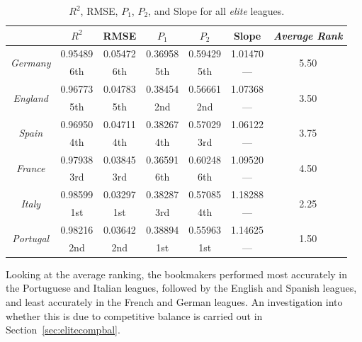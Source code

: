 \documentclass[a4paper,10pt]{report}
\begin{document}
\begin{table}[h!]\begin{center}\begin{tabular}{c||c|c|c|c|c||c}
&$R^2$ 		&RMSE		&$P_1$ 		&$P_2$ & Slope &\textit{Average Rank}\\ \hline \hline
\multirow{2}{*}{\textit{Germany}}	&0.95489	&0.05472	&0.36958	&0.59429& 1.01470 &
\multirow{2}{*}{5.50}\\ 
& 6th		& 6th		& 5th		& 5th 	& ---& \\\hline
\multirow{2}{*}{\textit{England}}	&0.96773	&0.04783	&0.38454	&0.56661 & 1.07368& \multirow{2}{*}{3.50}\\
& 5th		& 5th		& 2nd		& 2nd 	& --- & \\\hline
\multirow{2}{*}{\textit{Spain}}	&0.96950	&0.04711	&0.38267	&0.57029&  1.06122 &
\multirow{2}{*}{3.75}\\ 
& 4th		& 4th		& 4th		& 3rd 	&--- & \\\hline
\multirow{2}{*}{\textit{France}}	&0.97938	&0.03845	&0.36591	&0.60248& 1.09520 &
\multirow{2}{*}{4.50}\\ 
& 3rd		& 3rd		& 6th		& 6th 	&--- & \\\hline
\multirow{2}{*}{\textit{Italy}}	&0.98599	&0.03297	&0.38287	&0.57085& 1.18288 & 
\multirow{2}{*}{2.25}\\
& 1st		& 1st		& 3rd		& 4th 	&--- & \\\hline
\multirow{2}{*}{\textit{Portugal}}&0.98216	&0.03642	&0.38894	&0.55963&1.14625 &
\multirow{2}{*}{1.50}\\
& 2nd		& 2nd		& 1st		& 1st	& ---
\end{tabular}\end{center}\caption{$R^2$, RMSE, $P_1$, $P_2$, and Slope for all \textit{elite} leagues.}\label{tab:leaguevalues}
\end{table}


Looking at the average ranking, the bookmakers performed most accurately in the Portuguese and Italian leagues, followed by the English and Spanish leagues, and least accurately in the French and German leagues. An investigation into whether this is due to competitive balance is carried out in Section~\ref{sec:elitecompbal}.\pagebreak
\end{document}
